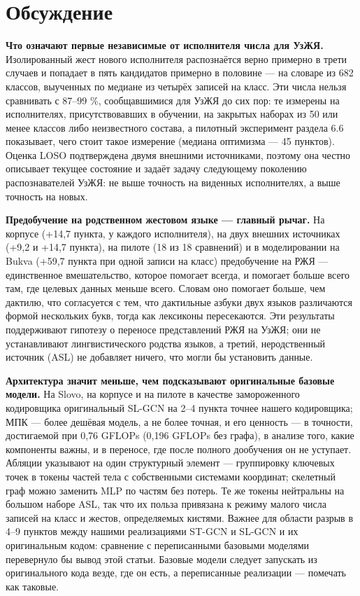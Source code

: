 \hypertarget{ux43eux431ux441ux443ux436ux434ux435ux43dux438ux435}{%
\section{Обсуждение}\label{ux43eux431ux441ux443ux436ux434ux435ux43dux438ux435}}

\textbf{Что означают первые независимые от исполнителя числа для УзЖЯ.} Изолированный жест нового исполнителя распознаётся верно примерно в трети случаев и попадает в пять кандидатов примерно в половине --- на словаре из 682 классов, выученных по медиане из четырёх записей на класс. Эти числа нельзя сравнивать с 87--99 \%, сообщавшимися для УзЖЯ до сих пор: те измерены на исполнителях, присутствовавших в обучении, на закрытых наборах из 50 или менее классов либо неизвестного состава, а пилотный эксперимент раздела 6.6 показывает, чего стоит такое измерение (медиана оптимизма --- 45 пунктов). Оценка LOSO подтверждена двумя внешними источниками, поэтому она честно описывает текущее состояние и задаёт задачу следующему поколению распознавателей УзЖЯ: не выше точность на виденных исполнителях, а выше точность на новых.

\textbf{Предобучение на родственном жестовом языке --- главный рычаг.} На корпусе (+14,7 пункта, у каждого исполнителя), на двух внешних источниках (+9,2 и +14,7 пункта), на пилоте (18 из 18 сравнений) и в моделировании на Bukva (+59,7 пункта при одной записи на класс) предобучение на РЖЯ --- единственное вмешательство, которое помогает всегда, и помогает больше всего там, где целевых данных меньше всего. Словам оно помогает больше, чем дактилю, что согласуется с тем, что дактильные азбуки двух языков различаются формой нескольких букв, тогда как лексиконы пересекаются. Эти результаты поддерживают гипотезу о переносе представлений РЖЯ на УзЖЯ; они не устанавливают лингвистического родства языков, а третий, неродственный источник (ASL) не добавляет ничего, что могли бы установить данные.

\textbf{Архитектура значит меньше, чем подсказывают оригинальные базовые модели.} На Slovo, на корпусе и на пилоте в качестве замороженного кодировщика оригинальный SL-GCN на 2--4 пункта точнее нашего кодировщика; МПК --- более дешёвая модель, а не более точная, и его ценность --- в точности, достигаемой при 0,76 GFLOPs (0,196 GFLOPs без графа), в анализе того, какие компоненты важны, и в переносе, где после полного дообучения он не уступает. Абляции указывают на один структурный элемент --- группировку ключевых точек в токены частей тела с собственными системами координат; скелетный граф можно заменить MLP по частям без потерь. Те же токены нейтральны на большом наборе ASL, так что их польза привязана к режиму малого числа записей на класс и жестов, определяемых кистями. Важнее для области разрыв в 4--9 пунктов между нашими реализациями ST-GCN и SL-GCN и их оригинальным кодом: сравнение с переписанными базовыми моделями перевернуло бы вывод этой статьи. Базовые модели следует запускать из оригинального кода везде, где он есть, а переписанные реализации --- помечать как таковые.

